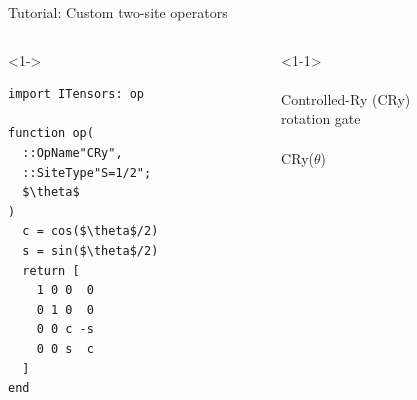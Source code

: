 \begin{frame}[fragile]{Tutorial: Custom two-site operators}

\begin{columns}

\begin{column}{5cm}

\begin{onlyenv}<1->

\begin{lstlisting}[language=JuliaLocal, style=julia, mathescape, basicstyle=\small]
import ITensors: op

function op(
  ::OpName"CRy",
  ::SiteType"S=1/2";
  $\theta$
)
  c = cos($\theta$/2)
  s = sin($\theta$/2)
  return [
    1 0 0  0
    0 1 0  0
    0 0 c -s
    0 0 s  c
  ]
end
\end{lstlisting}

\end{onlyenv}

\end{column}

\begin{column}{5cm}

\begin{onlyenv}<1-1>
~\\
~\\
Controlled-Ry (CRy) \\
rotation gate \\
~\\
CRy($\theta$) \\
~\\
~\\
~\\
~\\
~\\
~\\
~\\
~\\
~\\
~\\
\end{onlyenv}


\end{column}
\end{columns}
\end{frame}
